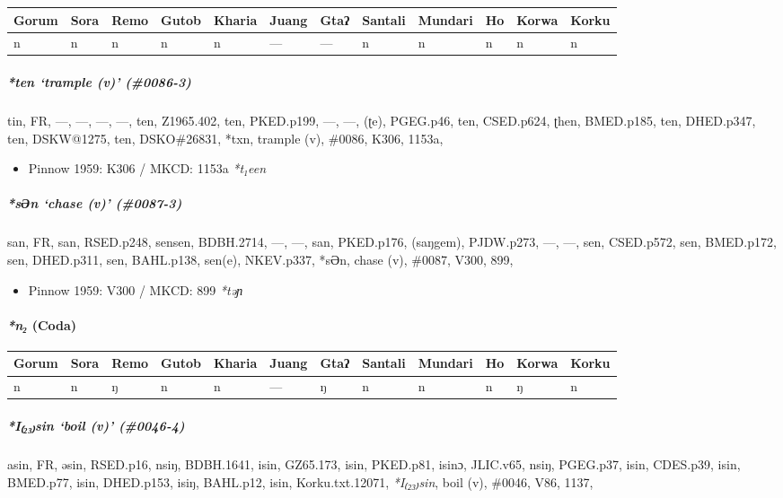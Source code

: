 \documentclass[a4paper,]{article}
\providecommand{\tightlist}{%
  \setlength{\itemsep}{0pt}\setlength{\parskip}{0pt}}
\let\oldparagraph\paragraph
\renewcommand{\paragraph}[1]{\oldparagraph{#1}\mbox{}}
\let\oldsubparagraph\subparagraph
\renewcommand{\subparagraph}[1]{\oldsubparagraph{#1}\mbox{}}
\begin{document}
\begin{longtable}[]{@{}llllllllllll@{}}
\toprule
Gorum & Sora & Remo & Gutob & Kharia & Juang & Gtaʔ & Santali & Mundari
& Ho & Korwa & Korku\tabularnewline
\midrule
\endhead
n & n & n & n & n & --- & --- & n & n & n & n & n\tabularnewline
\bottomrule
\end{longtable}

\subparagraph{\texorpdfstring{\emph{*ten} `trample (v)'
(\#0086-3)}{*ten trample (v) (\#0086-3)}}\label{ten-trample-v-0086-3}

tin, FR, ---, ---, ---, ---, ten, Z1965.402, ten, PKED.p199, ---, ---,
(ʈe), PGEG.p46, ten, CSED.p624, ʈhen, BMED.p185, ten, DHED.p347, ten,
DSKW@1275, ten, DSKO\#26831, *txn, trample (v), \#0086, K306, 1153a,

\begin{itemize}
\tightlist
\item
  Pinnow 1959: K306 / MKCD: 1153a \emph{*t₁een}
\end{itemize}

\subparagraph{\texorpdfstring{\emph{*sƏn} `chase (v)'
(\#0087-3)}{*sƏn chase (v) (\#0087-3)}}\label{sux259n-chase-v-0087-3}

san, FR, san, RSED.p248, sensen, BDBH.2714, ---, ---, san, PKED.p176,
(saŋgem), PJDW.p273, ---, ---, sen, CSED.p572, sen, BMED.p172, sen,
DHED.p311, sen, BAHL.p138, sen(e), NKEV.p337, *sƏn, chase (v), \#0087,
V300, 899,

\begin{itemize}
\tightlist
\item
  Pinnow 1959: V300 / MKCD: 899 \emph{*təɲ}
\end{itemize}

\paragraph{\texorpdfstring{\emph{*n₂}
(Coda)}{*n₂ (Coda)}}\label{n-coda-1}

\begin{longtable}[]{@{}llllllllllll@{}}
\toprule
Gorum & Sora & Remo & Gutob & Kharia & Juang & Gtaʔ & Santali & Mundari
& Ho & Korwa & Korku\tabularnewline
\midrule
\endhead
n & n & ŋ & n & n & --- & ŋ & n & n & n & ŋ & n\tabularnewline
\bottomrule
\end{longtable}

\subparagraph{\texorpdfstring{\emph{*I₍₂₃₎sin} `boil (v)'
(\#0046-4)}{*I₍₂₃₎sin boil (v) (\#0046-4)}}\label{isin-boil-v-0046-4}

asin, FR, əsin, RSED.p16, nsiŋ, BDBH.1641, isin, GZ65.173, isin,
PKED.p81, isinɔ, JLIC.v65, nsiŋ, PGEG.p37, isin, CDES.p39, isin,
BMED.p77, isin, DHED.p153, isiŋ, BAHL.p12, isin, Korku.txt.12071,
\emph{*I₍₂₃₎sin}, boil (v), \#0046, V86, 1137,
\end{document}
